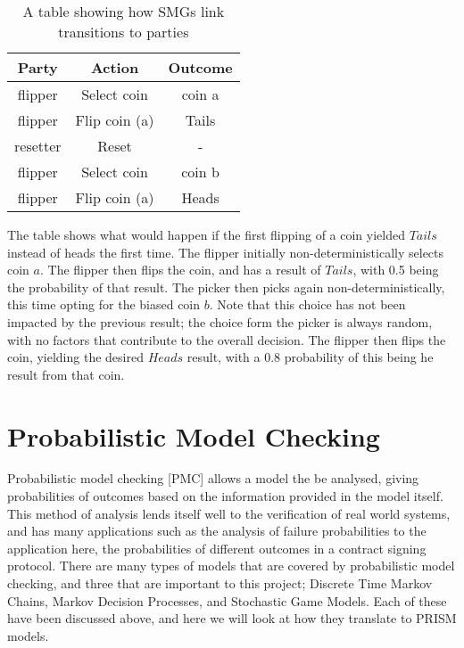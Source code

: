 \documentclass{l4proj}
\begin{document}
\begin{table}[]
\centering
\begin{tabular}{ c || c || c }
  \hline                       
  Party & Action & Outcome \\
  \hline
  flipper & Select coin & coin a  \\
  flipper & Flip coin (a) & Tails \\
  resetter & Reset & -  \\
  flipper & Select coin & coin b  \\
  flipper & Flip coin (a) & Heads \\
  \hline  
\end{tabular}
\caption{A table showing how SMGs link transitions to parties}
\label{smgTable}
\end{table}

The table shows what would happen if the first flipping of a coin yielded $Tails$ instead of heads the first time. The flipper initially non-deterministically selects coin $a$. The flipper then flips the coin, and has a result of $Tails$, with 0.5 being the probability of that result. The picker then picks again non-deterministically, this time opting for the biased coin $b$. Note that this choice has not been impacted by the previous result; the choice form the picker is always random, with no factors that contribute to the overall decision. The flipper then flips the coin, yielding the desired $Heads$ result, with a 0.8 probability of this being he result from that coin.



\section{Probabilistic Model Checking}


Probabilistic model checking [PMC] allows a model the be analysed, giving probabilities of outcomes based on the information provided in the model itself. This method of analysis lends itself well to the verification of real world systems, and has many applications such as the analysis of failure probabilities to the application here, the probabilities of different outcomes in a contract signing protocol. There are many types of models that are covered by probabilistic model checking, and three that are important to this project; Discrete Time Markov Chains, Markov Decision Processes, and Stochastic Game Models. Each of these have been discussed above, and here we will look at how they translate to PRISM models.
\end{document}
